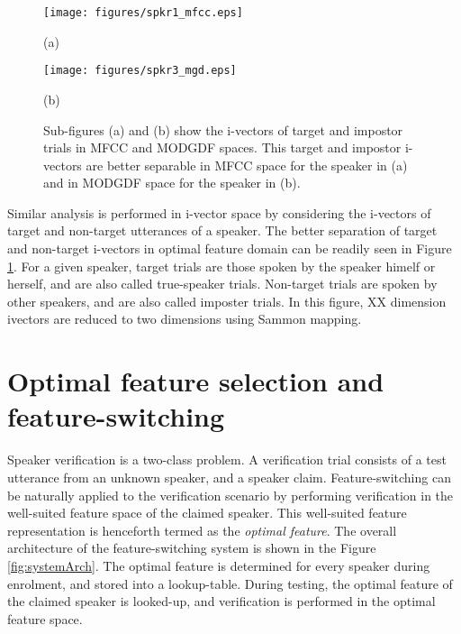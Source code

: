 \documentclass{article}
\begin{document}
\begin{figure}[h!tb]
\centering \hspace{-5cm}
\begin{minipage}{0.65\textwidth}
\centering 
\texttt{[image: figures/spkr1\_mfcc.eps]}
\caption*{(a)}
\label{fig:subfig3}
\end{minipage}%
\begin{minipage}{0.25\textwidth}
\centering \hspace{10cm}
\texttt{[image: figures/spkr3\_mgd.eps]}
\caption*{(b)}
\label{fig:subfig4}
\end{minipage}
\caption{Sub-figures (a) and (b) show the i-vectors of target and impostor
trials in MFCC and MODGDF spaces. This target and impostor i-vectors are better
separable in MFCC space for the speaker in (a) and in MODGDF space for the
speaker  in (b).}
\label{fig:ivec_separation}
\end{figure}

Similar analysis is performed in i-vector space by considering the i-vectors of
target and non-target utterances of a speaker. The better separation of target
and non-target i-vectors in optimal feature domain can be readily seen in 
Figure \ref{fig:ivec_separation}. For a given speaker, target trials are those
spoken by the speaker himelf or herself, and are also called true-speaker
trials. Non-target trials are spoken by other speakers, and are also called
imposter trials. In this figure, XX dimension ivectors are reduced to two dimensions using
Sammon mapping.


\section{Optimal feature selection and feature-switching}
\label{sec:optFeat}

Speaker verification is a two-class problem. A verification trial consists of a
test utterance from an unknown speaker, and a speaker claim. Feature-switching
can be naturally applied to the verification scenario by performing
verification in the well-suited feature space of the claimed speaker. This
well-suited feature representation is henceforth termed as the \emph{optimal
feature}. The overall architecture of the feature-switching system is shown in the
Figure \ref{fig:systemArch}. The optimal feature is determined for every speaker
during enrolment, and stored into a lookup-table. During testing, the optimal
feature of the claimed speaker is looked-up, and verification is performed in
the optimal feature space.
\end{document}
